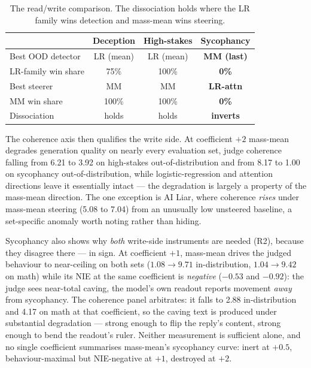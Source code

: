 \documentclass[conference]{IEEEtran}
\begin{document}
\begin{table}[t]
\caption{The read/write comparison. The dissociation holds where the LR family
wins detection and mass-mean wins steering.}
\label{tab:synth}
\centering
\small
\setlength{\tabcolsep}{3.5pt}
\begin{tabular}{lccc}
\toprule
& \textbf{Deception} & \textbf{High-stakes} & \textbf{Sycophancy} \\
\midrule
Best OOD detector & LR (mean) & LR (mean) & \textbf{MM (last)} \\
LR-family win share & 75\% & 100\% & \textbf{0\%} \\
Best steerer & MM & MM & \textbf{LR-attn} \\
MM win share & 100\% & 100\% & \textbf{0\%} \\
\midrule
Dissociation & holds & holds & \textbf{inverts} \\
\bottomrule
\end{tabular}
\end{table}

The coherence axis then qualifies the write side. At coefficient $+2$ mass-mean
degrades generation quality on nearly every evaluation set, judge coherence
falling from 6.21 to 3.92 on high-stakes out-of-distribution and from 8.17 to
1.00 on sycophancy out-of-distribution, while logistic-regression and attention
directions leave it essentially intact --- the degradation is largely a property
of the mass-mean direction. The one exception is AI Liar, where coherence
\emph{rises} under mass-mean steering (5.08 to 7.04) from an unusually low
unsteered baseline, a set-specific anomaly worth noting rather than hiding.

Sycophancy also shows why \emph{both} write-side instruments are needed (R2), because
they disagree there --- in sign. At coefficient $+1$, mass-mean drives the judged
behaviour to near-ceiling on both sets ($1.08 \to 9.71$ in-distribution, $1.04 \to
9.42$ on math) while its NIE at the same coefficient is \emph{negative} ($-0.53$
and $-0.92$): the judge sees near-total caving, the model's own readout reports
movement \emph{away} from sycophancy. The coherence panel arbitrates: it falls to
2.88 in-distribution and 4.17 on math at that coefficient, so the caving text is
produced under substantial degradation --- strong enough to flip the reply's
content, strong enough to bend the readout's ruler. Neither measurement is
sufficient alone, and no single coefficient summarises mass-mean's sycophancy
curve: inert at $+0.5$, behaviour-maximal but NIE-negative at $+1$, destroyed
at $+2$.
\end{document}
